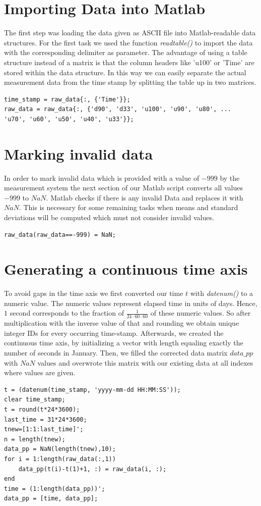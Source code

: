 \documentclass[10pt]{article}
\begin{document}
\section{Importing Data into Matlab}
The first step was loading the data given as ASCII file into Matlab-readable data structures. For the first task we used the function \textit{readtable()} to import the data with the corresponding delimiter as parameter. The advantage of using a table structure instead of a matrix is that the column headers like 'u100' or 'Time' are stored within the data structure. In this way we can easily separate the actual measurement data from the time stamp by splitting the table up in two matrices. \\
\begin{lstlisting}
time_stamp = raw_data{:, {'Time'}};
raw_data = raw_data{:, {'d90', 'd33', 'u100', 'u90', 'u80', ...
'u70', 'u60', 'u50', 'u40', 'u33'}};
\end{lstlisting}

\section{Marking invalid data}
In order to mark invalid data which is provided with a value of $-999$ by the measurement system the next section of our Matlab script converts all values $-999$ to $NaN$. Matlab checks if there is any invalid Data and replaces it with $NaN$. This is necessary for some remaining tasks when means and standard deviations will be computed which must not consider invalid values.\\
\begin{lstlisting}
raw_data(raw_data==-999) = NaN;
\end{lstlisting}

\section{Generating a continuous time axis}
To avoid gaps in the time axis we first converted our time $t$ with \textit{datenum()} to a numeric value. The numeric values represent elapsed time in units of days. Hence, $1$ second corresponds to the fraction of  $\frac{1}{24\cdot60\cdot60}$ of these numeric values. So after multiplication with the inverse value of that and rounding we obtain unique integer IDs for every occurring time-stamp. 
Afterwards, we created the continuous time axis, by initializing a vector with length equaling exactly the number of seconds in January. 
Then, we filled the corrected data matrix $data\_pp$ with $NaN$ values and overwrote this matrix with our existing data at all indexes where values are given.\\
\begin{lstlisting}
t = (datenum(time_stamp, 'yyyy-mm-dd HH:MM:SS'));
clear time_stamp;
t = round(t*24*3600);
last_time = 31*24*3600;
tnew=[1:1:last_time]';
n = length(tnew);
data_pp = NaN(length(tnew),10);
for i = 1:length(raw_data(:,1))
    data_pp(t(i)-t(1)+1, :) = raw_data(i, :);
end
time = (1:length(data_pp))';
data_pp = [time, data_pp];
\end{lstlisting}
\end{document}
